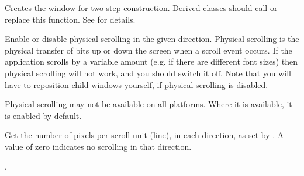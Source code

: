 Creates the window for two-step construction. Derived classes
should call or replace this function. See \rtfsp
for details.

\label{wxscrolledwindowenablescrolling}


Enable or disable physical scrolling in the given direction. Physical
scrolling is the physical transfer of bits up or down the
screen when a scroll event occurs. If the application scrolls by a
variable amount (e.g. if there are different font sizes) then physical
scrolling will not work, and you should switch it off. Note that you
will have to reposition child windows yourself, if physical scrolling
is disabled.





Physical scrolling may not be available on all platforms. Where it is available, it is enabled
by default.

\label{wxscrolledwindowgetscrollpixelsperunit}


Get the number of pixels per scroll unit (line), in each direction, as set
by . A value of zero indicates no
scrolling in that direction.





,\rtfsp
{}



